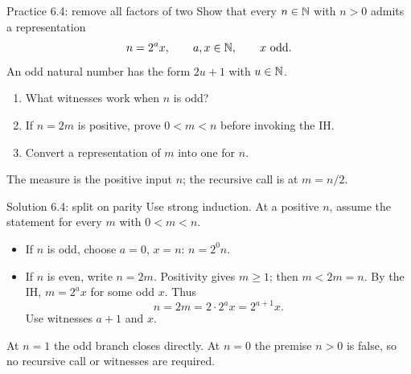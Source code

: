 \begin{frame}{Practice 6.4: remove all factors of two}
Show that every $n\in\mathbb{N}$ with $n>0$ admits a representation
\[
 n=2^a x,\qquad a,x\in\mathbb{N},\qquad x\text{ odd}.
\]
An odd natural number has the form $2u+1$ with $u\in\mathbb{N}$.
\begin{enumerate}
\item What witnesses work when $n$ is odd?
\item If $n=2m$ is positive, prove $0<m<n$ before invoking the IH.
\item Convert a representation of $m$ into one for $n$.
\end{enumerate}
The measure is the positive input $n$; the recursive call is at $m=n/2$.
\end{frame}

\begin{frame}{Solution 6.4: split on parity}
Use strong induction. At a positive $n$, assume the statement for every
$m$ with $0<m<n$.
\begin{itemize}
\item If $n$ is odd, choose $a=0$, $x=n$: $n=2^0n$.
\item If $n$ is even, write $n=2m$. Positivity gives $m\ge1$;
then $m<2m=n$. By the IH, $m=2^a x$ for some odd $x$.
Thus
\[
 n=2m=2\cdot2^a x=2^{a+1}x.
\]
Use witnesses $a+1$ and $x$.
\end{itemize}
At $n=1$ the odd branch closes directly. At $n=0$ the premise $n>0$
is false, so no recursive call or witnesses are required.
\end{frame}

